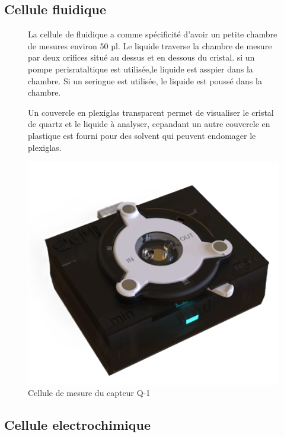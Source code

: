 \subsection{Cellule fluidique}
\begin{figure}[H]
    \centering
    \begin{minipage}{0.48\textwidth}
        \small
        La cellule de fluidique a comme spécificité d'avoir un petite chambre de mesures environ 50 µl.
        Le liquide traverse la chambre de mesure par deux orifices situé au dessus et en dessous du cristal. 
        si un pompe perisrataltique est utilisée,le liquide est asspier dans la chambre.
        Si un seringue est utilisée, le liquide est poussé dans la chambre.

        Un couvercle en plexiglas transparent permet de visualiser le cristal de quartz et le liquide à analyser,
        cepandant un autre couvercle en plastique est fourni pour des solvent qui peuvent endomager le plexiglas.
    \end{minipage}\hfill
    \begin{minipage}{0.48\textwidth}
        \centering
        \includegraphics[width=\textwidth]{assets/figures/fluidic cell.png}
        \caption{Cellule de mesure du capteur Q-1}
        \label{fig:cellule de mesure Q-1}
    \end{minipage}
\end{figure}
\subsection{Cellule electrochimique}

